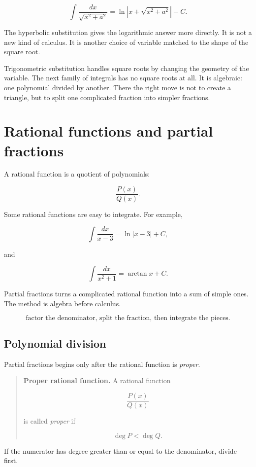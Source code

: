 \[
\boxed{
\int \frac{dx}{\sqrt{x^2+a^2}}
=
\ln|x+\sqrt{x^2+a^2}|+C.
}
\]

The hyperbolic substitution gives the logarithmic answer more directly.  It is not a new
kind of calculus.  It is another choice of variable matched to the shape of the square root.

Trigonometric substitution handles square roots by changing the geometry of the
variable.  The next family of integrals has no square roots at all.  It is algebraic: one
polynomial divided by another.  There the right move is not to create a triangle, but to
split one complicated fraction into simpler fractions.

\section{Rational functions and partial fractions}
\label{sec:rational-functions-partial-fractions}

A rational function is a quotient of polynomials:

\[
\frac{P(x)}{Q(x)}.
\]

Some rational functions are easy to integrate.  For example,

\[
\int \frac{dx}{x-3}
=
\ln|x-3|+C,
\]

and

\[
\int \frac{dx}{x^2+1}
=
\arctan x+C.
\]

Partial fractions turns a complicated rational function into a sum of simple ones.  The
method is algebra before calculus.

\[
\boxed{
\text{factor the denominator, split the fraction, then integrate the pieces.}
}
\]

\subsection{Polynomial division}
\label{subsec:polynomial-division-partial-fractions}

Partial fractions begins only after the rational function is \emph{proper}.

\begin{quote}
\textbf{Proper rational function.}
A rational function

\[
\frac{P(x)}{Q(x)}
\]

is called \emph{proper} if

\[
\deg P<\deg Q.
\]
\end{quote}

If the numerator has degree greater than or equal to the denominator, divide first.

